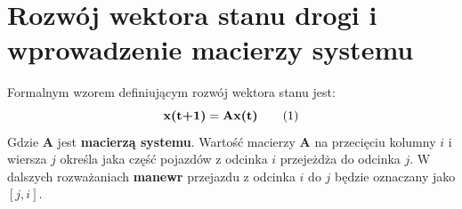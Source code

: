 \documentclass[12pt]{book}
\theoremstyle{plain}
\newcommand\addtag{\refstepcounter{equation}
\renewcommand{\labelenumii}{\theenumii}
\renewcommand{\theenumii}{\theenumi.\arabic{enumii}.}
\tag{\theequation}}
\newcommand{\myref}[1]{(\ref{#1})}
\begin{document}
\section{Rozwój wektora stanu drogi i wprowadzenie macierzy systemu} \label{sec:macierz_systemu_def}
Formalnym wzorem definiującym rozwój wektora stanu jest:
\[\textbf{x(t+1)}=\textbf{Ax(t)} \addtag \label{eq:single_road} \]
Gdzie $\textbf{A}$ jest \textbf{macierzą systemu}. Wartość macierzy $\textbf{A}$ na przecięciu kolumny $i$ i wiersza $j$  określa jaka część pojazdów z odcinka $i$ przejeżdża do odcinka $j$. W dalszych rozważaniach \textbf{manewr} przejazdu z odcinka $i$ do $j$ będzie oznaczany jako $[j,i]$.




%
\end{document}
